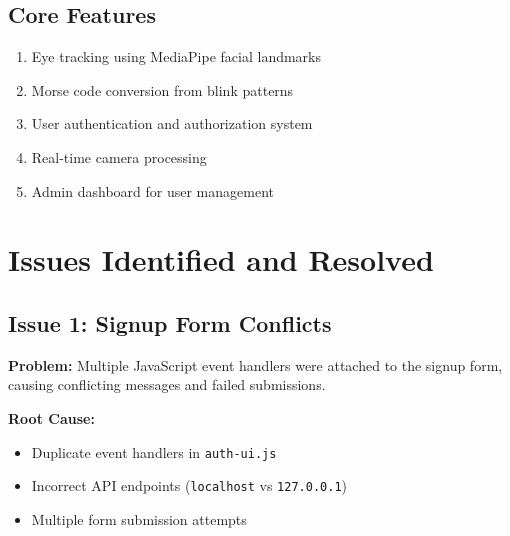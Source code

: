 \documentclass[12pt,a4paper]{article}
\begin{document}
\subsection{Core Features}
\begin{enumerate}
    \item Eye tracking using MediaPipe facial landmarks
    \item Morse code conversion from blink patterns
    \item User authentication and authorization system
    \item Real-time camera processing
    \item Admin dashboard for user management
\end{enumerate}

\section{Issues Identified and Resolved}

\subsection{Issue 1: Signup Form Conflicts}

\textbf{Problem:} Multiple JavaScript event handlers were attached to the signup form, causing conflicting messages and failed submissions.

\textbf{Root Cause:} 
\begin{itemize}
    \item Duplicate event handlers in \texttt{auth-ui.js}
    \item Incorrect API endpoints (\texttt{localhost} vs \texttt{127.0.0.1})
    \item Multiple form submission attempts
\end{itemize}
\end{document}
